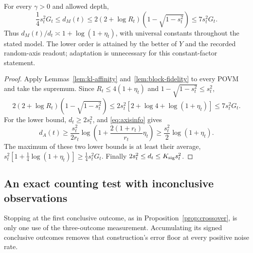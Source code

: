 \begin{theorem}
\label{thm:pointwise-complete}
For every $\gamma>0$ and allowed depth,
\begin{equation}\label{eq:pointwise-complete}
 \frac14s_t^2G_t\leq d_M(t)
 \leq2(2+\log R_t)(1-\sqrt{1-s_t^2})
 \leq7s_t^2G_t.
\end{equation}
Thus $d_M(t)/d_t\asymp1+\log(1+\eta_t)$, with universal constants
throughout the stated model. The lower order is attained by the better
of $Y$ and the recorded random-axis readout; adaptation is unnecessary
for this constant-factor statement.
\end{theorem}
\begin{proof}
Apply Lemmas~\ref{lem:kl-affinity} and~\ref{lem:block-fidelity} to every
POVM and take the supremum. Since
$R_t\leq4(1+\eta_t)$ and $1-\sqrt{1-s_t^2}\leq s_t^2$,
\[
 2(2+\log R_t)(1-\sqrt{1-s_t^2})
 \leq2s_t^2[2+\log4+\log(1+\eta_t)]\leq7s_t^2G_t.
\]
For the lower bound, $d_t\geq2s_t^2$, and
\eqref{eq:axisinfo} gives
\[
 d_A(t)\geq\frac{s_t^2}{2r_t}
       \log\!\left(1+\frac{2(1+r_t)}{r_t}\eta_t\right)
 \geq\frac{s_t^2}{2}\log(1+\eta_t).
\]
The maximum of these two lower bounds is at least their average,
$s_t^2[1+\tfrac14\log(1+\eta_t)]\geq\tfrac14s_t^2G_t$.
Finally $2s_t^2\leq d_t\leq K_{\rm sig}s_t^2$.
\end{proof}

\subsection{An exact counting test with inconclusive observations}
\label{sec:conclusive-counting}
Stopping at the first conclusive outcome, as in
Proposition~\ref{prop:crossover}, is only one use of the three-outcome
measurement. Accumulating its signed conclusive outcomes removes that
construction's error floor at every positive noise rate.

